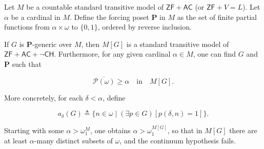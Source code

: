 Let $M$ be a countable standard transitive model of $\mathsf{ZF} + \mathsf{AC}$ (or $\mathsf{ZF} + V = L$). Let $\alpha$ be a cardinal in $M$. Define the forcing poset $\mathbf{P}$ in $M$ as the set of finite partial functions from $\alpha \times \omega$ to $\{0, 1\}$, ordered by reverse inclusion.

If $G$ is $\mathbf{P}$-generic over $M$, then $M[G]$ is a standard transitive model of $\mathsf{ZF} + \mathsf{AC} + \neg \mathsf{CH}$. Furthermore, for any given cardinal $\alpha \in M$, one can find $G$ and $\mathbf{P}$ such that

$$\overline{\mathcal{P}(\omega)} \geq \alpha \quad \text{in} \quad M[G].$$

More concretely, for each $\delta < \alpha$, define

$$a_\delta(G) \triangleq \{ n \in \omega \mid (\exists p \in G)[p(\delta, n) = 1] \}.$$

Starting with some $\alpha > \omega_1^M$, one obtains $\alpha > \omega_1^{M[G]}$, so that in $M[G]$ there are at least $\alpha$-many distinct subsets of $\omega$, and the continuum hypothesis fails.
